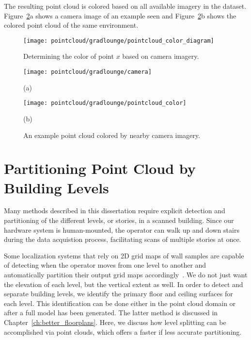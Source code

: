 \documentclass[12pt,onecolumn,oneside]{book}
\begin{document}
The resulting point cloud is colored based on all available imagery in the dataset.  Figure~\ref{fig:pointcloud_color}a shows a camera image of an example seen and Figure~\ref{fig:pointcloud_color}b shows the colored point cloud of the same environment.

\begin{figure}
	\centerline{\texttt{[image: pointcloud/gradlounge/pointcloud\_color\_diagram]}}
	\caption{Determining the color of point $x$ based on camera imagery.}
	\label{fig:pointcloud_color_diagram}
\end{figure}

\begin{figure}
	\begin{minipage}[t]{0.5\linewidth}
		\centerline{\texttt{[image: pointcloud/gradlounge/camera]}}
		\centerline{(a)}
	\end{minipage}
	\hfill
	\begin{minipage}[t]{0.5\linewidth}
		\centerline{\texttt{[image: pointcloud/gradlounge/pointcloud\_color]}}
		\centerline{(b)}
	\end{minipage}

	\caption{An example point cloud colored by nearby camera imagery.}
	\label{fig:pointcloud_color}
\end{figure}

\section{Partitioning Point Cloud by Building Levels}
\label{sec:pointcloud_level_split}

Many methods described in this dissertation require explicit detection and partitioning of the different levels, or stories, in a scanned building.  Since our hardware system is human-mounted, the operator can walk up and down stairs during the data acquistion process, facilitating scans of multiple stories at once.  

Some localization systems that rely on 2D grid maps of wall samples are capable of detecting when the operator moves from one level to another and automatically partition their output grid maps accordingly~\cite{MITBackpack}.  We do not just want the elevation of each level, but the vertical extent as well.  In order to detect and separate building levels, we identify the primary floor and ceiling surfaces for each level.  This identification can be done either in the point cloud domain or after a full model has been generated.  The latter method is discussed in Chapter~\ref{ch:better_floorplans}.  Here, we discuss how level splitting can be accomplished via point clouds, which offers a faster if less accurate partitioning.
\end{document}
